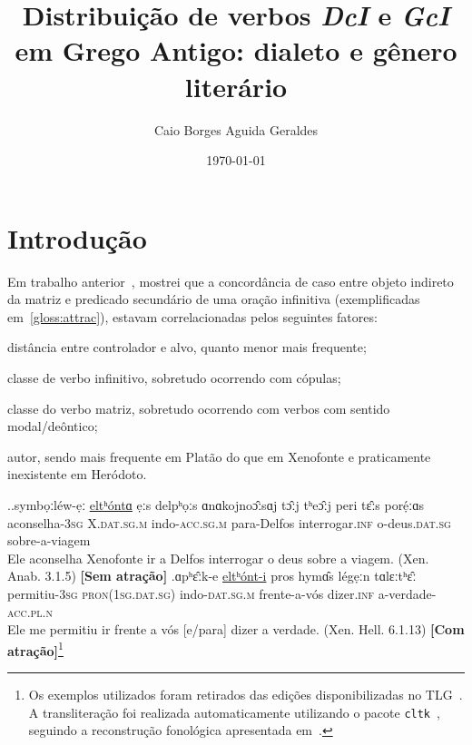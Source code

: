 \documentclass[article, 12pt]{memoir}
\author{Caio Borges Aguida Geraldes}
\title{Distribuição de verbos \emph{DcI} e \emph{GcI} em Grego Antigo: dialeto e gênero literário}
\date{\today}
\begin{document}
\maketitle

\begin{abstract}
  \lipsum[1]
\end{abstract}

\chapter{Introdução}

Em trabalho anterior~\cite{Geraldes2020,Geraldes2021}, mostrei que a concordância de caso entre objeto indireto da matriz e predicado secundário de uma oração infinitiva (exemplificadas em~\ref{gloss:attrac}), estavam correlacionadas pelos seguintes fatores:
\begin{inparaenum}[(a)]
  \item distância entre controlador e alvo, quanto menor mais frequente;
  \item classe de verbo infinitivo, sobretudo ocorrendo com cópulas;
  \item classe do verbo matriz, sobretudo ocorrendo com verbos com sentido modal\slash{}deôntico;
  \item autor, sendo mais frequente em Platão do que em Xenofonte e praticamente inexistente em Heródoto.
\end{inparaenum}


\ex.\label{gloss:attrac}\ag.\label{elthonta}symbọːléw-ẹː  \uline{eltʰóntɑ} {ẹːs delpʰọːs} ɑnɑkojnoɔ̂ːsɑj {tɔ̂ːj tʰeɔ̂ːj} {peri tɛ̂ːs porẹ́ːɑs}\\
aconselha-\textsc{3sg} X.\textsc{dat.sg.m} indo-\textsc{acc.sg.m} para-Delfos interrogar.\textsc{inf} o-deus.\textsc{dat.sg} sobre-a-viagem\\
Ele aconselha Xenofonte ir a Delfos interrogar o deus sobre a viagem. (Xen. Anab. 3.1.5) \textbf{[Sem atração]}
\bg.\label{elthonti}ɑpʰɛ̂ːk-e  \uline{eltʰónt-i} {pros hymɑ̂s} légẹːn tɑlɛːtʰɛ̂ː\\
permitiu-\textsc{3sg} \textsc{pron{(1sg.dat.sg)}} indo-\textsc{dat.sg.m} frente-a-vós dizer.\textsc{inf} a-verdade-\textsc{acc.pl.n}\\
Ele me permitiu ir frente a vós [e\slash{}para] dizer a verdade.  (Xen. Hell. 6.1.13) \textbf{[Com atração]}\footnote{Os exemplos utilizados foram retirados das edições disponibilizadas no TLG~\cite{tlg}. A transliteração foi realizada automaticamente utilizando o pacote \texttt{cltk}~\cite{johnson2014}, seguindo a reconstrução fonológica apresentada em~\textcite{Probert2010}.}
\end{document}
